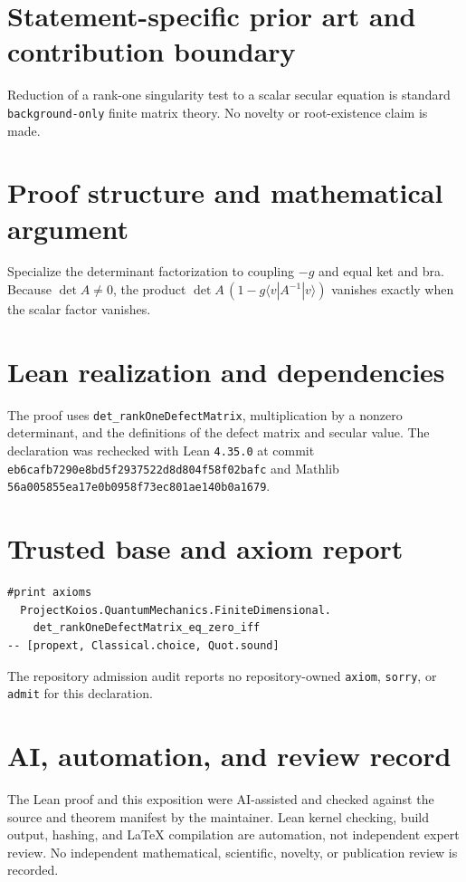 \documentclass[11pt]{article}
\begin{document}
\section{Statement-specific prior art and contribution boundary}
Reduction of a rank-one singularity test to a scalar secular equation is standard \texttt{background-only} finite matrix theory.  No novelty or root-existence claim is made.

\section{Proof structure and mathematical argument}
Specialize the determinant factorization to coupling $-g$ and equal ket and bra.  Because $\det A\ne0$, the product
$\det A\,(1-g\langle v|A^{-1}|v\rangle)$ vanishes exactly when the scalar factor vanishes.

\section{Lean realization and dependencies}
The proof uses \texttt{det\_rankOneDefectMatrix}, multiplication by a nonzero determinant, and the definitions of the defect matrix and secular value.  The declaration was rechecked with Lean \texttt{4.35.0} at commit \texttt{eb6cafb7290e8bd5f2937522d8d804f58f02bafc} and Mathlib \texttt{56a005855ea17e0b0958f73ec801ae140b0a1679}.

\section{Trusted base and axiom report}
\begin{verbatim}
#print axioms
  ProjectKoios.QuantumMechanics.FiniteDimensional.
    det_rankOneDefectMatrix_eq_zero_iff
-- [propext, Classical.choice, Quot.sound]
\end{verbatim}
The repository admission audit reports no repository-owned \texttt{axiom}, \texttt{sorry}, or
\texttt{admit} for this declaration.

\section{AI, automation, and review record}
The Lean proof and this exposition were AI-assisted and checked against the source and theorem
manifest by the maintainer.  Lean kernel checking, build output, hashing, and LaTeX compilation are
automation, not independent expert review.  No independent mathematical, scientific, novelty, or
publication review is recorded.
\end{document}
